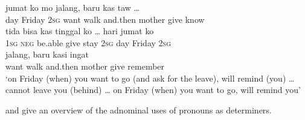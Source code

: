 \ea
\label{Example_6.50}
 {{jumat}} {ko} {{mo}} {{jalang,}} {{baru}} {{}} {kas} {{taw}} {\ldots}\\ %
 day  {Friday}  \textsc{2sg}  {want}  {walk}  {and.then}  {mother}  give  {know}  \\
\gll {}  {tida}  {bisa}  {kas}  {tinggal}  {ko}  {\ldots}  hari  {jumat}  {ko}\\
 \textsc{1sg}  {\textsc{neg}}  {be.able}  {give}  {stay}  {\textsc{2sg}}  {}  day  {Friday}  {\textsc{2sg}}\\
  {jalang,}  {baru}  {}  {kasi}  {ingat}\\
 {want}  {walk}  {and.then}  {mother}  {give}  {remember}\\
\glt
‘on Friday (when) you want to go (and ask for the leave),  will remind (you) {\ldots}  cannot leave you (behind) {\ldots} on Friday (when) you want to go,  will remind you’ \textstyleExampleSource{[080917-003b-CvEx.0011/0015/0020]}
\z



 and  give an overview of the adnominal uses of pronouns as determiners.


